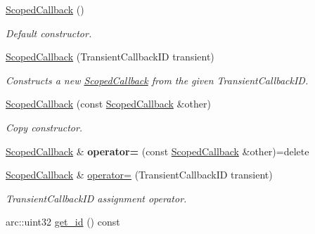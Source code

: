 \begin{DoxyCompactItemize}
\item 
\hyperlink{classsigma_1_1core_1_1_scoped_callback_ab7d6ecc53f4f2ae5c099aa432ca5fe46}{Scoped\+Callback} ()
\begin{DoxyCompactList}\small\item\em Default constructor. \end{DoxyCompactList}\item 
\hyperlink{classsigma_1_1core_1_1_scoped_callback_aa6b342b546577026badad33e7bf521b9}{Scoped\+Callback} (Transient\+Callback\+I\+D transient)
\begin{DoxyCompactList}\small\item\em Constructs a new \hyperlink{classsigma_1_1core_1_1_scoped_callback}{Scoped\+Callback} from the given Transient\+Callback\+I\+D. \end{DoxyCompactList}\item 
\hyperlink{classsigma_1_1core_1_1_scoped_callback_ae39d91862f76b1804acc8edae410678e}{Scoped\+Callback} (const \hyperlink{classsigma_1_1core_1_1_scoped_callback}{Scoped\+Callback} \&other)
\begin{DoxyCompactList}\small\item\em Copy constructor. \end{DoxyCompactList}\item 
\hypertarget{classsigma_1_1core_1_1_scoped_callback_ab0eabc2e0c158643758501f9c6bc444c}{}\hyperlink{classsigma_1_1core_1_1_scoped_callback}{Scoped\+Callback} \& {\bfseries operator=} (const \hyperlink{classsigma_1_1core_1_1_scoped_callback}{Scoped\+Callback} \&other)=delete\label{classsigma_1_1core_1_1_scoped_callback_ab0eabc2e0c158643758501f9c6bc444c}

\item 
\hyperlink{classsigma_1_1core_1_1_scoped_callback}{Scoped\+Callback} \& \hyperlink{classsigma_1_1core_1_1_scoped_callback_a482feda3a077f8c4877a4a56df7eefa3}{operator=} (Transient\+Callback\+I\+D transient)
\begin{DoxyCompactList}\small\item\em Transient\+Callback\+I\+D assignment operator. \end{DoxyCompactList}\item 
\hypertarget{classsigma_1_1core_1_1_scoped_callback_a7db354f147b3e625319f640de420cbbb}{}arc\+::uint32 \hyperlink{classsigma_1_1core_1_1_scoped_callback_a7db354f147b3e625319f640de420cbbb}{get\+\_\+id} () const \label{classsigma_1_1core_1_1_scoped_callback_a7db354f147b3e625319f640de420cbbb}


\end{DoxyCompactItemize}
